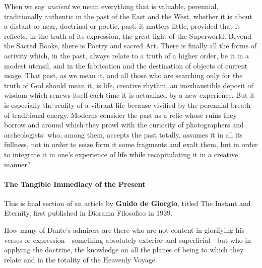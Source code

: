 When we say \emph{ancient} we mean everything that is valuable, perennial, traditionally authentic in the past of the East and the West, whether it is about a distant or near, doctrinal or poetic, past: it matters little, provided that it reflects, in the truth of its expression, the great light of the Superworld. Beyond the Sacred Books, there is Poetry and sacred Art. There is finally all the forms of activity which, in the past, always relate to a truth of a higher order, be it in a modest utensil, and in the fabrication and the destination of objects of current usage. That past, as we mean it, and all those who are searching only for the truth of God should mean it, is life, creative rhythm, an inexhaustible deposit of wisdom which renews itself each time it is actualized by a new experience. But it is especially the reality of a vibrant life because vivified by the perennial breath of traditional energy. Moderns consider the past as a relic whose ruins they borrow and around which they prowl with the curiosity of photographers and archeologists: who, among them, accepts the past totally, assumes it in all its fullness, not in order to seize form it some fragments and exalt them, but in order to integrate it in one's experience of life while recapitulating it in a creative manner?


\paragraph{The Tangible Immediacy of the Present}

\begin{quotex}
This is final section of an article by \textbf{Guido de Giorgio}, titled The Instant and Eternity, first published in Diorama Filosofico in 1939.
\end{quotex}


How many of Dante's admirers are there who are not content in glorifying his verses or expression---something absolutely exterior and superficial---but who in applying the doctrine, the knowledge on all the planes of being to which they relate and in the totality of the Heavenly Voyage.

